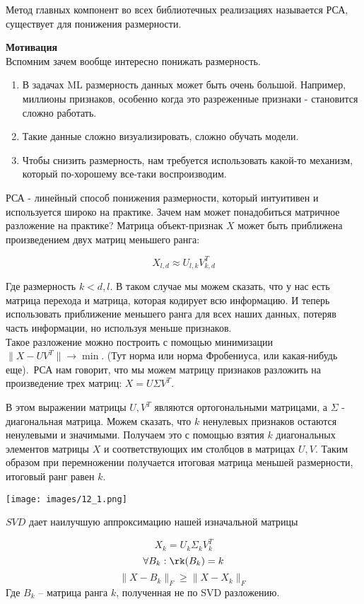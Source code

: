 Метод главных компонент во всех библиотечных реализациях называется РСА, существует для понижения размерности.

\textbf{Мотивация}\\

Вспомним зачем вообще интересно понижать размерность.
\begin{enumerate}
    \item В задачах ML размерность данных может быть очень большой. Например, миллионы признаков, особенно когда это разреженные признаки - становится сложно работать.
    \item Такие данные сложно визуализировать, сложно обучать модели.
    \item Чтобы снизить размерность, нам требуется использовать какой-то механизм, который по-хорошему все-таки воспроизводим.
\end{enumerate}


РСА - линейный способ понижения размерности, который интуитивен и используется широко на практике. Зачем нам может понадобиться матричное разложение на практике?
Матрица объект-признак $X$ может быть приближена произведением двух матриц меньшего ранга:

$$X_{l,d} \approx U_{l, k}V_{k,d}^T$$

Где размерность $k < d, l$. В таком случае мы можем сказать, что у нас есть матрица перехода и матрица, которая кодирует всю информацию. И теперь использовать приближение меньшего ранга для всех наших данных, потеряв часть информации, но используя меньше признаков. \\

Такое разложение можно построить с помощью минимизации $\|X - UV^T\| \to \min$. (Тут норма или норма Фробениуса, или какая-нибудь еще).\
РСА нам говорит, что мы можем матрицу признаков разложить на произведение трех матриц: $X = U\Sigma V^T$.

В этом выражении матрицы $U, V^T$ являются ортогональными матрицами, а $\Sigma$ - диагональная матрица. Можем сказать, что $k$ ненулевых признаков остаются ненулевыми и значимыми. Получаем это с помощью взятия $k$ диагональных элементов матрицы $X$ и соответствующих им столбцов в матрицах $U, V$. Таким образом при перемножении получается итоговая матрица меньшей размерности, итоговый ранг равен $k$.

\begin{center}
    \texttt{[image: images/12\_1.png]}
\end{center}

\begin{theorem}
$SVD$ дает наилучшую аппроксимацию нашей изначальной матрицы

$$X_k = U_k\Sigma_k V_k^T$$
$$\forall B_k : \rk(B_k) = k$$
$$\|X - B_k\|_F \geqslant \|X - X_k\|_F$$
Где $B_k$ -- матрица ранга $k$, полученная не по SVD разложению.
\end{theorem}

